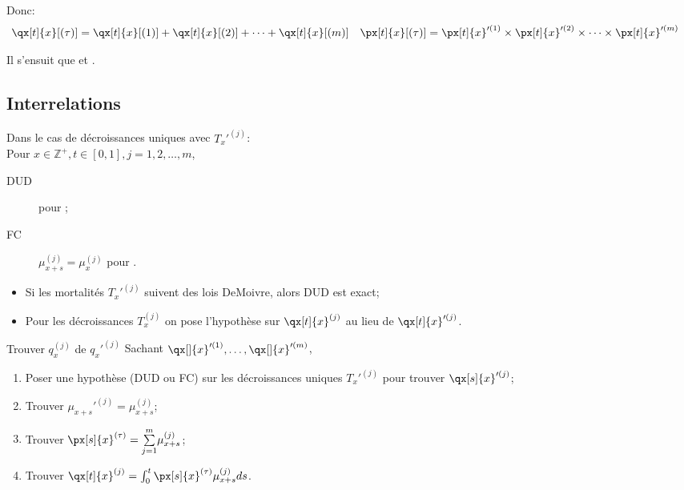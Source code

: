 \documentclass[10pt, french]{article}
\begin{document}
\begin{multicols*}{2}
Donc:
\begin{align*}
	\qx[t]{x}[(\tau)]
	&=	\qx[t]{x}[(1)]	+	\qx[t]{x}[(2)]	+	\dots	+	\qx[t]{x}[(m	)]	&
	\px[t]{x}[(\tau)]
	&=	\px[t]{x}'^{(1)}	\times	\px[t]{x}'^{(2)}	\times	\dots	\times	\px[t]{x}'^{(m)}
\end{align*}

Il s'ensuit que  et .

\columnbreak
\subsection{Interrelations}
\begin{rappel_enhanced}[Hypothèses]
Dans le cas de décroissances uniques avec $T_{x}'^{(j)}$:\\

Pour $x \in \mathbb{Z}^{+}, t \in [0, 1], j = 1, 2, \dots, m$,
\begin{description}
	\item[DUD]	 pour ;
	\item[FC]	$\mu_{x + s}^{(j)} = \mu_{x}^{(j)}$ pour .
\end{description}

\begin{itemize}[leftmargin = *]
	\item	Si les mortalités $T_{x}'^{(j)}$ suivent des lois DeMoivre, alors DUD est exact;
	\item	Pour les décroissances $T_{x}^{(j)}$ on pose l'hypothèse sur $\qx[t]{x}^{(j)}$ au lieu de $\qx[t]{x}'^{(j)}$.
\end{itemize}
\end{rappel_enhanced}

\begin{conceptgen}{Trouver $q_{x}^{(j)}$ de $q_{x}'^{(j)}$}
Sachant $\qx[]{x}'^{(1)}, \dots, \qx[]{x}'^{(m)}$,
\begin{enumerate}
	\item	Poser une hypothèse (DUD ou FC) sur les décroissances uniques $T_{x}'^{(j)}$ pour trouver $\qx[s]{x}'^{(j)}$;
	\item	Trouver $\mu_{x + s}'^{(j)}	=	\mu_{x + s}^{(j)}$;
	\item	Trouver $\px[s]{x}^{(\tau)}	=	\sumz{m}{j = 1}\mu_{x + s}^{(j)}$;
	\item	Trouver $\qx[t]{x}^{(j)}	=	\int_{0}^{t}\px[s]{x}^{(\tau)}\mu_{x + s}^{(j)}ds$.
\end{enumerate}


\end{conceptgen}
\end{multicols*}
\end{document}
